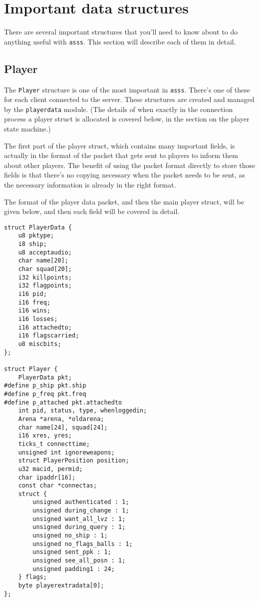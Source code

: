\documentclass{article}
\newcommand{\asss}{\texttt{asss}}
\begin{document}
\section{Important data structures}

There are several important structures that you'll need to know about to
do anything useful with \asss{}. This section will describe each of them
in detail.

\subsection{Player}

The \verb/Player/ structure is one of the most important in \asss{}.
There's one of these for each client connected to the server. These
structures are created and managed by the \verb/playerdata/ module. (The
details of when exactly in the connection process a player struct is
allocated is covered below, in the section on the player state machine.)

The first part of the player struct, which contains many important
fields, is actually in the format of the packet that gets sent to
players to inform them about other players. The benefit of using the
packet format directly to store those fields is that there's no copying
necessary when the packet needs to be sent, as the necessary information
is already in the right format.

The format of the player data packet, and then the main player struct,
will be given below, and then each field will be covered in detail.

\begin{verbatim}
struct PlayerData {
    u8 pktype;
    i8 ship;
    u8 acceptaudio;
    char name[20];
    char squad[20];
    i32 killpoints;
    i32 flagpoints;
    i16 pid;
    i16 freq;
    i16 wins;
    i16 losses;
    i16 attachedto;
    i16 flagscarried;
    u8 miscbits;
};

struct Player {
    PlayerData pkt;
#define p_ship pkt.ship
#define p_freq pkt.freq
#define p_attached pkt.attachedto
    int pid, status, type, whenloggedin;
    Arena *arena, *oldarena;
    char name[24], squad[24];
    i16 xres, yres;
    ticks_t connecttime;
    unsigned int ignoreweapons;
    struct PlayerPosition position;
    u32 macid, permid;
    char ipaddr[16];
    const char *connectas;
    struct {
        unsigned authenticated : 1;
        unsigned during_change : 1;
        unsigned want_all_lvz : 1;
        unsigned during_query : 1;
        unsigned no_ship : 1;
        unsigned no_flags_balls : 1;
        unsigned sent_ppk : 1;
        unsigned see_all_posn : 1;
        unsigned padding1 : 24;
    } flags;
    byte playerextradata[0];
};
\end{verbatim}
\end{document}
